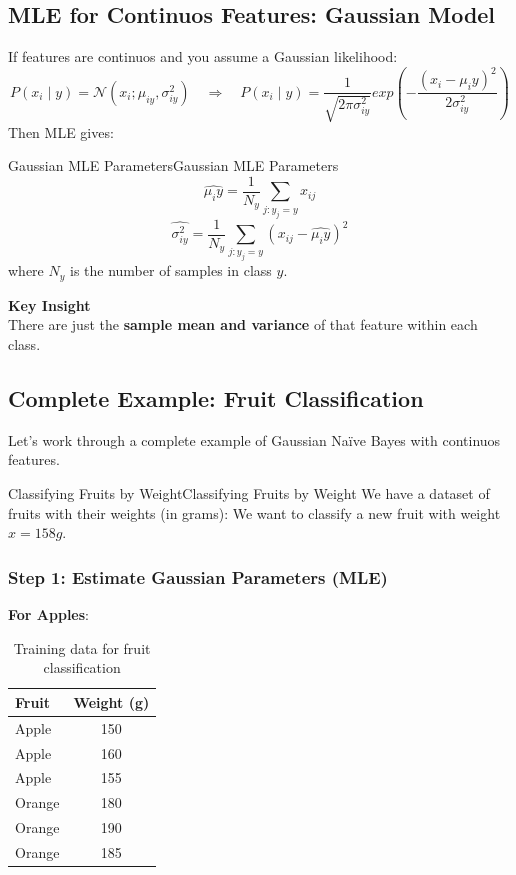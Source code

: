 \documentclass[a4paper]{article}
\theoremstyle{definition}
\begin{document}
\subsection{MLE for Continuos Features: Gaussian Model}
If features are continuos and you assume a Gaussian likelihood:
\[
  P(x_i \mid y) = \mathcal{N}(x_i; \mu_{iy}, \sigma_{iy}^2) \quad \Rightarrow \quad P(x_i \mid y) = \frac{1}{\sqrt{2\pi\sigma_{iy}^2}}exp(-\frac{(x_i - \mu_iy)^2}{2\sigma_{iy}^2})
\]
Then MLE gives:
\begin{definition}{Gaussian MLE Parameters}{Gaussian MLE Parameters}
\[
  \hat{\mu_iy} = \frac{1}{N_y} \sum_{j: y_j = y} x_{ij}
\]
\[
  \hat{\sigma_{iy}^2} = \frac{1}{N_y} \sum_{j: y_j = y} (x_{ij} - \hat{\mu_iy})^2
\]
where \( N_y \) is the number of samples in class \( y \).
\end{definition}
\begin{tcolorbox}[
    colback=blue!15!white,
    colframe=blue!15!white,
    boxrule=0pt,
    arc=0pt,
    halign=center
]
    \textbf{Key Insight}\\[0.6em]
    There are just the \textbf{sample mean and variance} of that feature within each class.
\end{tcolorbox}
\subsection{Complete Example: Fruit Classification}
Let's work through a complete example of Gaussian Naïve Bayes with continuos features.
\begin{example}{Classifying Fruits by Weight}{Classifying Fruits by Weight}
We have a dataset of fruits with their weights (in grams):
\vspace{1em}
\noindent
\newline
We want to classify a new fruit with weight \( x = 158 g \).
\end{example}
\subsubsection{Step 1: Estimate Gaussian Parameters (MLE)}
\textbf{For Apples}:

\begin{table}[h]
\centering
\begin{tabular}{|l|c|}
\hline
\textbf{Fruit} & \textbf{Weight (g)} \\
\hline
Apple  & 150 \\
Apple  & 160 \\
Apple  & 155 \\
Orange & 180 \\
Orange & 190 \\
Orange & 185 \\
\hline
\end{tabular}
\caption{Training data for fruit classification}
\end{table}
\end{document}
